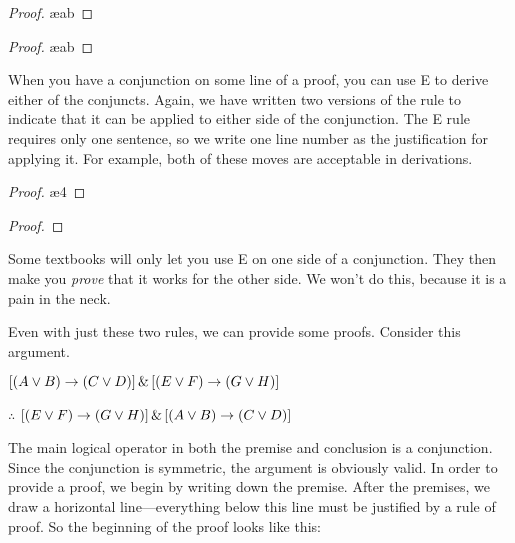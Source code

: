 \begin{multicols}{2}
\begin{proof}
	 \ae{ab}
\end{proof}

\begin{proof}
	 \ae{ab}
\end{proof}
\end{multicols}

When you have a conjunction on some line of a proof, you can use {\eand}E to derive either of the conjuncts. Again, we have written two versions of the rule to indicate that it can be applied to either side of the conjunction. The {\eand}E rule requires only one sentence, so we write one line number as the justification for applying it. For example, both of these moves are acceptable in derivations. 

\begin{multicols}{2}
\begin{proof}
 \ae{4}
\end{proof}

\begin{proof}
 
\end{proof}
\end{multicols}
Some textbooks will only let you use \eand E on one side of a conjunction. They then make you \emph{prove} that it works for the other side. We won't do this, because it is a pain in the neck. 

Even with just these two rules, we can provide some proofs. Consider this argument.
\begin{earg}
\item[] $[(A\vee B)\rightarrow(C\vee D)] \,\&\, [(E \vee F) \rightarrow (G\vee H)]$
\item[$\therefore$] $[(E \vee F) \rightarrow (G\vee H)] \,\&\, [(A\vee B)\rightarrow(C\vee D)]$
\end{earg}
The main logical operator in both the premise and conclusion is a conjunction. Since the conjunction is symmetric, the argument is obviously valid. In order to provide a proof, we begin by writing down the premise. After the premises, we draw a horizontal line---everything below this line must be justified by a rule of proof. So the beginning of the proof looks like this:


